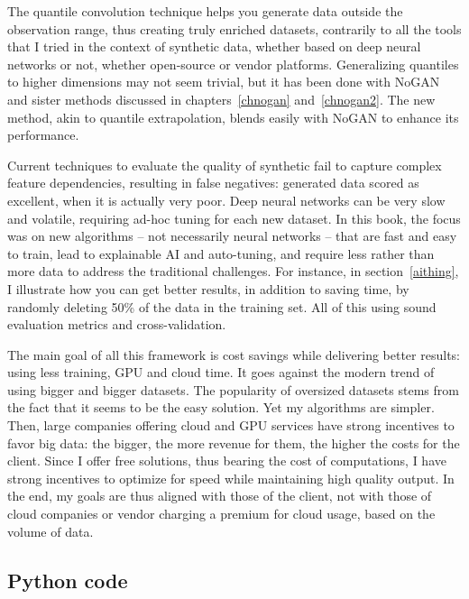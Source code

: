 \documentclass[oneside,10pt]{book}
\begin{document}
The quantile convolution technique helps you generate data outside the observation range, thus 
creating truly enriched datasets, contrarily to all the tools that I tried in the context of synthetic data, whether based on deep neural networks or not, whether open-source or vendor platforms. 
Generalizing quantiles to higher dimensions may not seem trivial, but it has been done with NoGAN and sister methods discussed in chapters~\ref{chnogan} and~\ref{chnogan2}. The new method, akin to
 quantile extrapolation, blends easily with NoGAN to enhance its performance.

Current techniques to evaluate the quality of synthetic fail to capture complex feature dependencies, resulting in false negatives: generated data scored as excellent, when it is actually very poor. Deep neural networks can be very slow and volatile, requiring ad-hoc tuning for each new dataset. In this book, the focus was on new algorithms -- not necessarily neural networks -- that are fast and easy to train, lead to 
 explainable AI and auto-tuning, and require less rather than more data to address the traditional challenges.  
 For instance, in section~\ref{aithing}, I illustrate how you can get better results, in addition to saving time,
 by randomly deleting 50\% of the data in the training set. All of this using sound evaluation metrics
 and cross-validation.

The main goal of all this framework is cost savings while delivering better results: using less training, GPU and cloud time. It goes
 against the modern trend of using bigger and bigger datasets. The popularity of oversized datasets stems from the fact that it seems to be the easy solution. Yet my algorithms are simpler. Then, large companies offering
 cloud and GPU services have strong incentives to favor big data: the bigger, the more revenue for them, the
 higher the costs for the client. Since I offer free solutions, thus bearing the cost of computations, I have strong incentives to optimize for speed while maintaining high quality output. In the end, my goals are thus aligned
 with those of the client, not with those of cloud companies or vendor charging a premium for cloud usage, based on the volume of data. 


\subsection{Python code}\label{pylgore}
\end{document}
